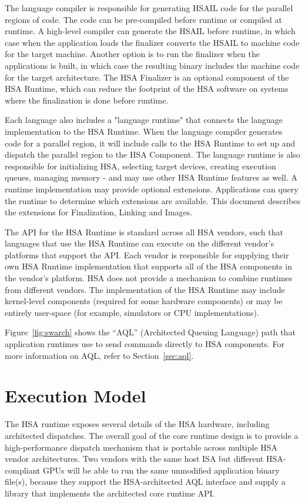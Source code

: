 \documentclass[final]{book}
\begin{document}
The language compiler is responsible for generating HSAIL code for the parallel
regions of code. The code can be pre-compiled before runtime or compiled at
runtime. A high-level compiler can generate the HSAIL before runtime, in which
case when the application loads the finalizer converts the HSAIL to machine
code for the target machine. Another option is to run the finalizer when
the applications is built, in which case the resulting binary includes the machine
code for the target architecture. The HSA Finalizer is an optional component of
the HSA Runtime, which can reduce the footprint of the HSA software on systems
where the finalization is done before runtime.

Each language also includes a "language runtime" that connects the language
implementation to the HSA Runtime. When the language compiler generates code for
a parallel region, it will include calls to the HSA Runtime to set up and
dispatch the parallel region to the HSA Component. The language runtime is also
responsible for initializing HSA, selecting target devices, creating execution
queues, managing memory - and may use other HSA Runtime features as well.
A runtime implementation may provide optional extensions. Applications can
query the runtime to determine which extensions are available. This document
describes the extensions for Finalization, Linking and Images.

The API for the HSA Runtime is standard across all HSA vendors, such that
languages that use the HSA Runtime can execute on the different vendor's
platforms that support the API. Each vendor is responsible for supplying their
own HSA Runtime implementation that supports all of the HSA components in the
vendor's platform. HSA does not provide a mechanism to combine runtimes from
different vendors. The implementation of the HSA Runtime may include
kernel-level components (required for some hardware components) or may be entirely
user-space (for example, simulators or CPU implementations).

Figure~\ref{fig:swarch} shows the ``AQL'' (Architected Queuing
Language) path that application runtimes use to send commands directly to
HSA components. For more information on AQL, refer to Section~\ref{sec:aql}.


\section{Execution Model}\label{executionmodel}

The HSA runtime exposes several details of the HSA hardware, including
architected dispatches. The overall goal of the core runtime design is to
provide a high-performance dispatch mechanism that is portable across multiple
HSA vendor architectures. Two vendors with the same host ISA but different
HSA-compliant GPUs will be able to run the same unmodified application binary
file(s), because they support the HSA-architected AQL interface and supply a
library that implements the architected core runtime API.
\end{document}
